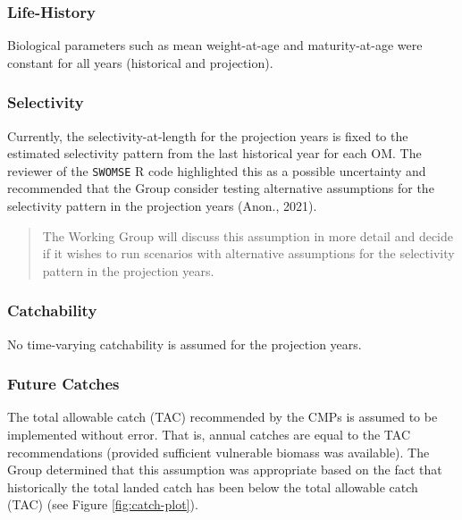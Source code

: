 \documentclass[
]{article}
\begin{document}
\hypertarget{life-history}{%
\subsubsection{Life-History}\label{life-history}}

Biological parameters such as mean weight-at-age and maturity-at-age were constant for all years (historical and projection).

\hypertarget{selectivity-1}{%
\subsubsection{Selectivity}\label{selectivity-1}}

Currently, the selectivity-at-length for the projection years is fixed to the estimated selectivity pattern from the last historical year for each OM. The reviewer of the \texttt{SWOMSE} R code highlighted this as a possible uncertainty and recommended that the Group consider testing alternative assumptions for the selectivity pattern in the projection years (Anon., 2021).

\begin{quote}
The Working Group will discuss this assumption in more detail and decide if it wishes to run scenarios with alternative assumptions for the selectivity pattern in the projection years.
\end{quote}

\hypertarget{catchability}{%
\subsubsection{Catchability}\label{catchability}}

No time-varying catchability is assumed for the projection years.

\hypertarget{future-catches}{%
\subsubsection{Future Catches}\label{future-catches}}

The total allowable catch (TAC) recommended by the CMPs is assumed to be implemented without error. That is, annual catches are equal to the TAC recommendations (provided sufficient vulnerable biomass was available). The Group determined that this assumption was appropriate based on the fact that historically the total landed catch has been below the total allowable catch (TAC) (see Figure \ref{fig:catch-plot}).
\end{document}
